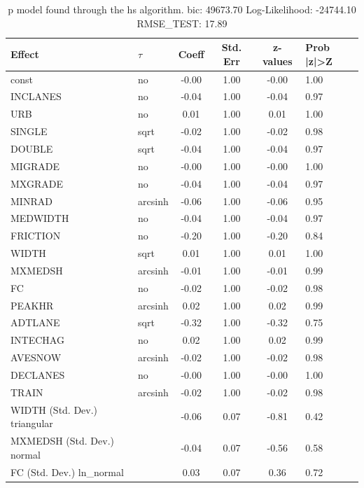 \begin{table}
	\caption{p model found through the hs algorithm. bic: 49673.70 Log-Likelihood: -24744.10 RMSE_TEST: 17.89}
	\begin{center}
		\begin{tabular}{|l|l|c|c|c|l|}
			\hline
			Effect & $\tau$ & Coeff & Std. Err & z-values & Prob |z|>Z \\
			\hline
			const & no & -0.00 & 1.00 & -0.00 & 1.00 \\
			\hline
			INCLANES & no & -0.04 & 1.00 & -0.04 & 0.97 \\
			\hline
			URB & no & 0.01 & 1.00 & 0.01 & 1.00 \\
			\hline
			SINGLE & sqrt & -0.02 & 1.00 & -0.02 & 0.98 \\
			\hline
			DOUBLE & sqrt & -0.04 & 1.00 & -0.04 & 0.97 \\
			\hline
			MIGRADE & no & -0.00 & 1.00 & -0.00 & 1.00 \\
			\hline
			MXGRADE & no & -0.04 & 1.00 & -0.04 & 0.97 \\
			\hline
			MINRAD & arcsinh & -0.06 & 1.00 & -0.06 & 0.95 \\
			\hline
			MEDWIDTH & no & -0.04 & 1.00 & -0.04 & 0.97 \\
			\hline
			FRICTION & no & -0.20 & 1.00 & -0.20 & 0.84 \\
			\hline
			WIDTH & sqrt & 0.01 & 1.00 & 0.01 & 1.00 \\
			\hline
			MXMEDSH & arcsinh & -0.01 & 1.00 & -0.01 & 0.99 \\
			\hline
			FC & no & -0.02 & 1.00 & -0.02 & 0.98 \\
			\hline
			PEAKHR & arcsinh & 0.02 & 1.00 & 0.02 & 0.99 \\
			\hline
			ADTLANE & sqrt & -0.32 & 1.00 & -0.32 & 0.75 \\
			\hline
			INTECHAG & no & 0.02 & 1.00 & 0.02 & 0.99 \\
			\hline
			AVESNOW & arcsinh & -0.02 & 1.00 & -0.02 & 0.98 \\
			\hline
			DECLANES & no & -0.00 & 1.00 & -0.00 & 1.00 \\
			\hline
			TRAIN & arcsinh & -0.02 & 1.00 & -0.02 & 0.98 \\
			\hline
			WIDTH (Std. Dev.) triangular &  & -0.06 & 0.07 & -0.81 & 0.42 \\
			\hline
			MXMEDSH (Std. Dev.) normal &  & -0.04 & 0.07 & -0.56 & 0.58 \\
			\hline
			FC (Std. Dev.) ln_normal &  & 0.03 & 0.07 & 0.36 & 0.72 \\

\end{tabular}
\end{center}
\end{table}
